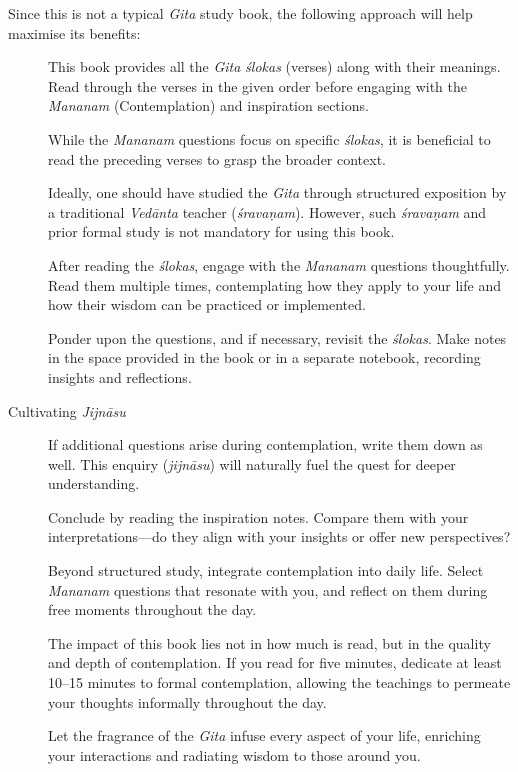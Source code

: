 {Since this is not a typical \emph{Gita} study book, the following approach will help maximise its benefits:
\begin{description}
  \item[ \textemdash] This book provides all the \emph{Gita} \emph{ślokas} (verses) along with their meanings. Read through the verses in the given order before engaging with the \emph{Mananam} (Contemplation) and inspiration sections.
  \item[ \textemdash] While the \emph{Mananam} questions focus on specific \emph{ślokas}, it is beneficial to read the preceding verses to grasp the broader context.
  \item[ \textemdash] Ideally, one should have studied the \emph{Gita} through structured exposition by a traditional \emph{Vedānta} teacher (\emph{śravaṇam}). However, such \emph{śravaṇam} and prior formal study is not mandatory for using this book.
  \item[ \textemdash] After reading the \emph{ślokas}, engage with the \emph{Mananam} questions thoughtfully. Read them multiple times, contemplating how they apply to your life and how their wisdom can be practiced or implemented.
  \item[  \textemdash] Ponder upon the questions, and if necessary, revisit the \emph{ślokas}. Make notes in the space provided in the book or in a separate notebook, recording insights and reflections.
  \item[Cultivating \emph{Jijnāsu} \textemdash] If additional questions arise during contemplation, write them down as well. This enquiry (\emph{jijnāsu}) will naturally fuel the quest for deeper understanding.
  \item[  \textemdash] Conclude by reading the inspiration notes. Compare them with your interpretations—do they align with your insights or offer new perspectives?
  \item[  \textemdash] Beyond structured study, integrate contemplation into daily life. Select \emph{Mananam} questions that resonate with you, and reflect on them during free moments throughout the day.
  \item[ \textemdash] The impact of this book lies not in how much is read, but in the quality and depth of contemplation. If you read for five minutes, dedicate at least 10–15 minutes to formal contemplation, allowing the teachings to permeate your thoughts informally throughout the day.
  \item[ \textemdash] Let the fragrance of the \emph{Gita} infuse every aspect of your life, enriching your interactions and radiating wisdom to those around you.
\end{description} }
